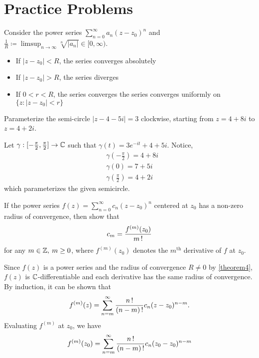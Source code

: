 \documentclass[11pt]{article}
\begin{document}
\section{Practice Problems}
\begin{remark}
	Consider the power series $\sum_{n=0}^\infty a_n(z-z_0)^n$ and $\frac{1}{R}
	\coloneqq \limsup_{n\to\infty} \sqrt[n]{|a_n|} \in [0,\infty)$.
	\begin{itemize}
		\item If $|z-z_0| < R$, the series converges absolutely
		\item If $|z-z_0| > R$, the series diverges
		\item If $0 < r < R$, the series converges the series converges
			uniformly on $\{z:|z-z_0|<r\}$
	\end{itemize}
	\begin{exercise}
		Parameterize the semi-circle $|z-4-5i|=3$ clockwise, starting from
	$z = 4 + 8i$ to $z = 4 + 2i$.
	\end{exercise}
	Let $\gamma: [-\frac{\pi}{2},\frac{\pi}{2}] \to \mathbb{C}$ such that
	$\gamma(t) = 3e^{-it} + 4 + 5i$. Notice,
	\begin{align*}
		&\gamma\left(-\frac{\pi}{2}\right) = 4 + 8i\\
		&\gamma(0) = 7+5i\\
		&\gamma\left(\frac{\pi}{2}\right)= 4 + 2i
	\end{align*}
	which parameterizes the given semicircle.
	\begin{exercise}
		If the power series $f(z) = \sum^\infty_{n=0}c_n(z-z_0)^n$
		centered at $z_0$ has a non-zero radius of convergence, then
		show that
		\begin{equation*}
			c_m = \frac{f^{(m)}(z_0)}{m\operatorname{!}}
		\end{equation*}
		for any $m\in\mathbb{Z},\> m\geq 0$, where $f^{(m)}(z_0)$ denotes the
		$m^{\text{th}}$ derivative of $f$ at $z_0$.
	\end{exercise}
	Since $f(z)$ is a power series and the radius of convergence $R \neq
	0$ by \cref{theorem4}, $f(z)$ is $\mathbb{C}$-differentiable and each
	derivative has the same radius of convergence. By induction, it can
	be shown that
	\begin{equation*}
		f^{(m)}(z) = \sum^\infty_{n=m}\frac{n\operatorname{!}}{(n-m)\operatorname{!}}
		c_n(z-z_0)^{n-m}.
	\end{equation*}
	Evaluating $f^{(m)}$ at $z_0$, we have
	\begin{align*}
		f^{(m)}(z_0) &= \sum^\infty_{n=m}\frac{n\fact}{(n-m)\fact}
		c_n(z_0-z_0)^{n-m}\\

\end{align*}
\end{remark}
\end{document}
